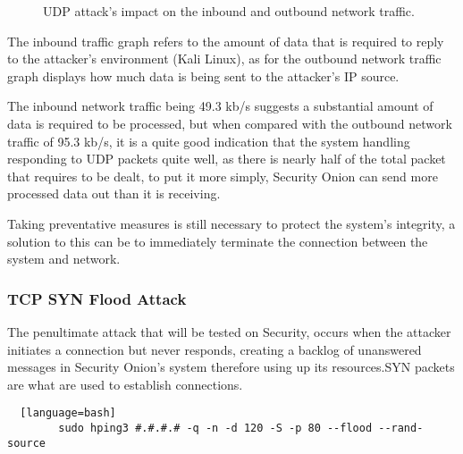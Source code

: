 \documentclass[12pt]{article}
\begin{document}
		
		\begin{center}
		\begin{figure}[H]
			\centering
			\qquad
			\caption{UDP attack's impact on the inbound and outbound network traffic.}
			\label{fig:net}
		\end{figure}
		
		\end{center}
		The inbound traffic graph refers to the amount of data that is required to reply to the attacker's environment (Kali Linux), as for the outbound network traffic graph displays how much data is being sent to the attacker's IP source.
		
		The inbound network traffic being 49.3 kb/s suggests a substantial amount of data is required to be processed, but when compared with the outbound network traffic of 95.3 kb/s, it is a quite good indication that the system handling responding to UDP packets quite well, as there is nearly half of the total packet that requires to be dealt, to put it more simply, Security Onion can send more processed data out than it is receiving.
		
		Taking preventative measures is still necessary to protect the system's integrity, a solution to this can be to immediately terminate the connection between the system and network.
		
		
		
		\subsubsection{TCP SYN Flood Attack}
		
		The penultimate attack that will be tested on Security, occurs when the attacker initiates a connection but never responds, creating a backlog of unanswered messages in Security Onion's system therefore using up its resources.SYN packets are what are used to establish connections.
		
		\begin{lstlisting}  [language=bash]
		sudo hping3 #.#.#.# -q -n -d 120 -S -p 80 --flood --rand-source
		\end{lstlisting}
		
\end{document}
